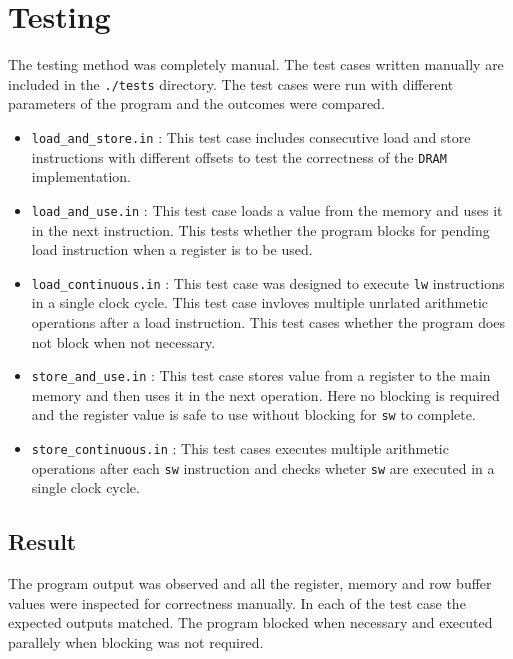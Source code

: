 \documentclass[hidelinks,12pt]{article}
\begin{document}
\section{Testing}

The testing method was completely manual. The test cases written manually are included in the \verb|./tests| directory. The test cases were run with different parameters
of the program and the outcomes were compared.
\begin{itemize}
    \item \verb|load_and_store.in| : This test case includes consecutive load and store instructions with different offsets to test the correctness of the \verb|DRAM| implementation.
    \item \verb|load_and_use.in| : This test case loads a value from the memory and uses it in the next instruction. This tests whether the program blocks for pending load instruction when a register is to be used.
    \item \verb|load_continuous.in| : This test case was designed to execute \verb|lw| instructions in a single clock cycle. This test case invloves multiple unrlated arithmetic operations after a load instruction. This test cases whether the program does not block when not necessary.
    \item \verb|store_and_use.in| : This test case stores value from a register to the main memory and then uses it in the next operation. Here no blocking is required and the register value is safe to use without blocking for \verb|sw| to complete.
    \item \verb|store_continuous.in| : This test cases executes multiple arithmetic operations after each \verb|sw| instruction and checks wheter \verb|sw| are executed in a single clock cycle.
\end{itemize}

\subsection{Result}
The program output was observed and all the register, memory and row buffer values were inspected for correctness manually. In each of the test case the expected outputs matched. The program blocked when necessary and executed parallely when blocking was not required.
\end{document}
